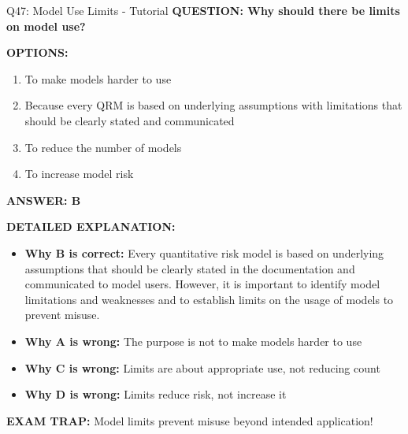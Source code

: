 \documentclass[8pt]{beamer}
\begin{document}
	\begin{frame}{Q47: Model Use Limits - Tutorial}
		\fontsize{6.5}{7.5}\selectfont
		\textbf{QUESTION: Why should there be limits on model use?}
		
		\vspace{0.1cm}
		\textbf{OPTIONS:}
		\begin{enumerate}
			\item To make models harder to use
			\item Because every QRM is based on underlying assumptions with limitations that should be clearly stated and communicated
			\item To reduce the number of models
			\item To increase model risk
		\end{enumerate}
		
		\vspace{0.1cm}
		\textcolor{myblue}{\textbf{ANSWER: B}}
		
		\vspace{0.1cm}
		\textbf{DETAILED EXPLANATION:}
		\begin{itemize}
			\item \textbf{Why B is correct:} Every quantitative risk model is based on underlying assumptions that should be clearly stated in the documentation and communicated to model users. However, it is important to identify model limitations and weaknesses and to establish limits on the usage of models to prevent misuse.
			\item \textbf{Why A is wrong:} The purpose is not to make models harder to use
			\item \textbf{Why C is wrong:} Limits are about appropriate use, not reducing count
			\item \textbf{Why D is wrong:} Limits reduce risk, not increase it
		\end{itemize}
		
		\textcolor{myred}{\textbf{EXAM TRAP:}} Model limits prevent \textcolor{myblue}{misuse beyond intended application}!
	\end{frame}
	
\end{document}
